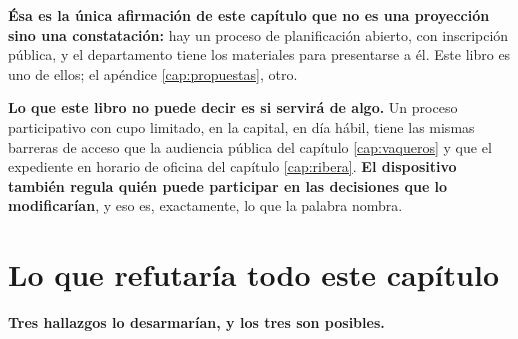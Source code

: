 \begin{cautela}
\textbf{Ésa es la única afirmación de este capítulo que no es una proyección sino una
constatación:} hay un proceso de planificación abierto, con inscripción pública, y el
departamento tiene los materiales para presentarse a él. Este libro es uno de ellos; el apéndice
\ref{cap:propuestas}, otro.

\textbf{Lo que este libro no puede decir es si servirá de algo.} Un proceso participativo con
cupo limitado, en la capital, en día hábil, tiene las mismas barreras de acceso que la audiencia
pública del capítulo \ref{cap:vaqueros} y que el expediente en horario de oficina del capítulo
\ref{cap:ribera}. \textbf{El dispositivo también regula quién puede participar en las decisiones
que lo modificarían}, y eso es, exactamente, lo que la palabra nombra.
\end{cautela}

\section{Lo que refutaría todo este capítulo}

\textbf{Tres hallazgos lo desarmarían, y los tres son posibles.}

